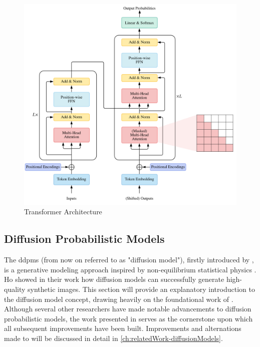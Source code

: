 \begin{figure}
  \includegraphics[width=0.8\linewidth]{images/transformer.png}
\caption[Transformers]{Transformer Architecture \cite[Figure 1, p. 3]{lin2022SurveyTransformers}} \label{fig:transformer}
\end{figure}


\subsection{Diffusion Probabilistic Models}
\label{ch:preliminaries-diffusionProbabilisticModels}

The \Glspl{ddpm} (from now on referred to as "diffusion model"), firstly introduced by \cite{sohl-dickstein2015DeepUnsupervisedLearning}, is a generative modeling approach inspired by non-equilibrium statistical physics \cite{sohl-dickstein2015DeepUnsupervisedLearning}.
Ho \etal showed in their work \cite{ho2020DenoisingDiffusionProbabilistic} how diffusion models can successfully generate high-quality synthetic images.
This section will provide an explanatory introduction to the diffusion model concept, drawing heavily on the foundational work of \cite{ho2020DenoisingDiffusionProbabilistic}.
Although several other researchers have made notable advancements to diffusion probabilistic models, the work presented in \cite{sohl-dickstein2015DeepUnsupervisedLearning, ho2020DenoisingDiffusionProbabilistic} 
serves as the cornerstone upon which all subsequent improvements have been built.
Improvements and alternations made to \cite{ho2020DenoisingDiffusionProbabilistic} will be discussed in detail in \autoref{ch:relatedWork-diffusionModels}.

